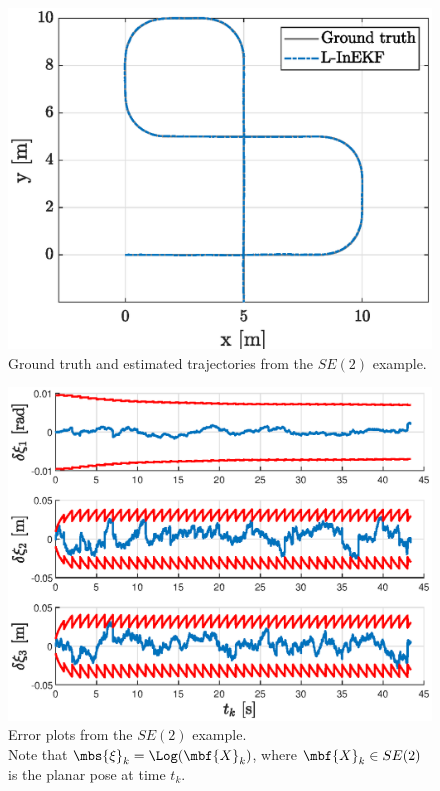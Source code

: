 \documentclass[nobib, nofonts, notoc]{tufte-handout}
\begin{document}
    \begin{figure}[h]
        \centering
        \includegraphics[width=\textwidth]{figs/se2_example_trajectories.eps}
        \caption{Ground truth and estimated trajectories from the $SE(2)$ example.}
        \label{fig:se2_example_trajectories}
    \end{figure}

    \begin{figure}[h]
        \centering
        \includegraphics[width=\textwidth]{figs/se2_example_error_plots.eps}
        \caption{Error plots from the $SE(2)$ example.\\ Note that $\mbs{\xi}_{k} = \Log(\mbf{X}_{k})$, where $\mbf{X}_{k}\in SE(2)$ is the planar pose at time $t_{k}$.}
        \label{fig:se2_example_error_plots}
    \end{figure}

    \clearpage
    \begin{appendices}
        
    \end{appendices}

    \clearpage
    
    
\end{document}
